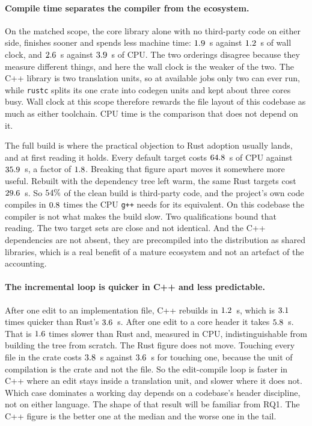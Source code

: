 \documentclass[english,oneside,a4paper,censored,csm,software-track-2020]{HYthesisML}
\begin{document}
\paragraph{Compile time separates the compiler from the ecosystem.}
On the matched scope, the core library alone with no third-party code on either side,
\BuildLibWallFaster{} finishes sooner and \BuildLibCpuCheaper{} spends less machine time:
$1.9$~s against $1.2$~s of wall clock, and $2.6$~s against
$3.9$~s of CPU. The two orderings disagree because they measure different things,
and here the wall clock is the weaker of the two. The C++ library is two translation units, so at
\AdoptJobs{} available jobs only two can ever run, while \texttt{rustc} splits its one crate into
codegen units and kept about three cores busy. Wall clock at this scope therefore rewards the
file layout of this codebase as much as either toolchain. CPU time is the comparison that does
not depend on it.

The full build is where the practical objection to Rust adoption usually lands, and at first
reading it holds. Every default target costs $64.8$~s of CPU against
$35.9$~s, a factor of $1.8$. Breaking that figure apart moves it somewhere
more useful. Rebuilt with the dependency tree left warm, the same Rust targets cost
$29.6$~s. So $54\%$ of the clean build is third-party code, and
the project's own code compiles in $0.8$ times the CPU \texttt{g++} needs
for its equivalent. On this codebase the compiler is not what makes the build slow. Two
qualifications bound that reading. The two target sets are close and not identical. And the C++
dependencies are not absent, they are precompiled into the distribution as shared libraries, which
is a real benefit of a mature ecosystem and not an artefact of the accounting.

\paragraph{The incremental loop is quicker in C++ and less predictable.}
After one edit to an implementation file, C++ rebuilds in $1.2$~s, which is
$3.1$ times quicker than Rust's $3.6$~s. After one edit to a core header it
takes $5.8$~s. That is $1.6$ times slower than Rust and, measured
in CPU, indistinguishable from building the tree from scratch. The Rust figure does not move.
Touching every file in the crate costs $3.8$~s against $3.6$~s for
touching one, because the unit of compilation is the crate and not the file. So the edit-compile
loop is faster in C++ where an edit stays inside a translation unit, and slower where it does not.
Which case dominates a working day depends on a codebase's header discipline, not on
either language. The shape of that result will be familiar from RQ1. The C++ figure is the better
one at the median and the worse one in the tail.
\end{document}
